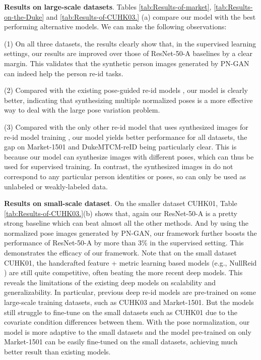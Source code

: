 \documentclass[10pt,letterpaper,twocolumn,10pt,letterpaper,twocolumn]{article}
\begin{document}
\noindent \textbf{Results on large-scale datasets}. Tables \ref{tab:Results-of-market},
\ref{tab:Results-on-the-Duke} and \ref{tab:Results-of-CUHK03.} (a)
compare our model with the best performing alternative models. We
can make the following observations:

\noindent (1) On all three datasets, the results clearly show that,
in the supervised learning settings, our results are improved over
those of ResNet-50-A baselines by a clear margin. This validates that
the synthetic person images generated by PN-GAN can indeed help the
person re-id tasks. 

\noindent \noindent (2) Compared with the existing pose-guided re-id
models \cite{zhao2017spindle,zheng2017pose,su2017pose}, our model
is clearly better, indicating that synthesizing multiple normalized
poses is a more effective way to deal with the large pose variation
problem. 

\noindent \noindent (3) Compared with the only other re-id model
that uses synthesized images for re-id model training \cite{zheng2017unlabeled},
our model yields better performance for all datasets, the gap on Market-1501
and DukeMTCM-reID being particularly clear. This is because our model
can synthesize images with different poses, which can thus be used
for supervised training. In contrast, the synthesized images in \cite{zheng2017unlabeled}
do not correspond to any particular person identities or poses, so
can only be used as unlabeled or weakly-labeled data. 

\noindent \textbf{Results on small-scale dataset}. On the smaller
dataset \textendash{} CUHK01, Table \ref{tab:Results-of-CUHK03.}(b)
shows that, again our ResNet-50-A is a pretty strong baseline which
can beat almost all the other methods. And by using the normalized
pose images generated by PN-GAN, our framework further boosts the
performance of ResNet-50-A by more than $3\%$ in the supervised setting.
This demonstrates the efficacy of our framework. Note that on the
small dataset CUHK01, the handcrafted feature + metric learning based
models (e.g., NullReid \cite{NullReid}) are still
quite competitive, often beating the more recent deep models. This
reveals the limitations of the existing deep models on scalability
and generalizability. In particular, previous deep re-id models are
pre-trained on some large-scale training datasets, such as CUHK03
and Market-1501. But the models still struggle to fine-tune on the
small datasets such as CUHK01 due to the covariate condition differences
between them. With the pose normalization, our model is more adaptive
to the small datasets and the model pre-trained on only Market-1501
can be easily fine-tuned on the small datasets, achieving much better
result than existing models.
\end{document}
